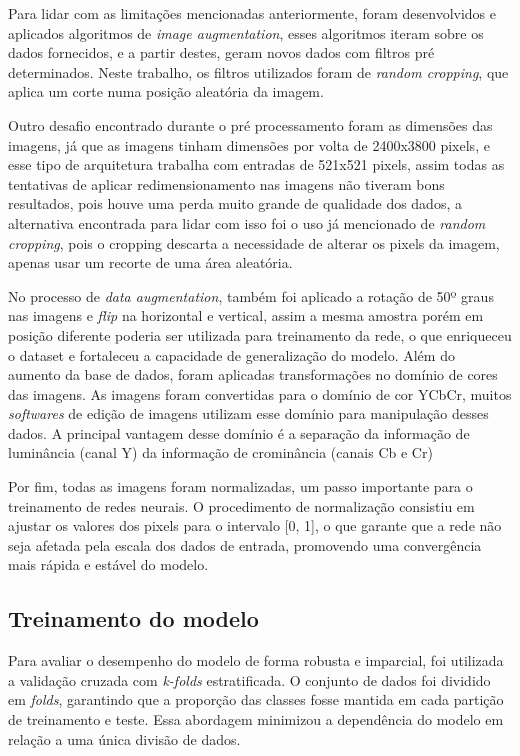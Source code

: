 Para lidar com as limitações mencionadas anteriormente, foram desenvolvidos e aplicados algoritmos de \textit{image augmentation}, esses algoritmos iteram sobre os dados fornecidos, e a partir destes, geram novos dados com filtros pré determinados. Neste trabalho, os filtros utilizados foram de \textit{random cropping}, que aplica um corte numa posição aleatória da imagem.

Outro desafio encontrado durante o pré processamento foram as dimensões das imagens, já que as imagens tinham dimensões por volta de 2400x3800 pixels, e esse tipo de arquitetura trabalha com entradas de 521x521 pixels, assim todas as tentativas de aplicar redimensionamento nas imagens não tiveram bons resultados, pois houve uma perda muito grande de qualidade dos dados, a alternativa encontrada para lidar com isso foi o uso já mencionado de \textit{random cropping}, pois o cropping descarta a necessidade de alterar os pixels da imagem, apenas usar um recorte de uma área aleatória.

No processo de \textit{data augmentation}, também foi aplicado a rotação de 50º graus nas imagens e \textit{flip} na horizontal e vertical, assim a mesma amostra porém em posição diferente poderia ser utilizada para treinamento da rede, o que enriqueceu o dataset e fortaleceu a capacidade de generalização do modelo. 
Além do aumento da base de dados, foram aplicadas transformações no domínio de cores das imagens. As imagens foram convertidas para o domínio de cor YCbCr, muitos \textit{softwares} de edição de imagens utilizam esse domínio para manipulação desses dados. A principal vantagem desse domínio é a separação da informação de luminância (canal Y) da informação de crominância (canais Cb e Cr)

Por fim, todas as imagens foram normalizadas, um passo importante para o treinamento de redes neurais. O procedimento de normalização consistiu em ajustar os valores dos pixels para o intervalo [0, 1], o que garante que a rede não seja afetada pela escala dos dados de entrada, promovendo uma convergência mais rápida e estável do modelo.

\subsection{Treinamento do modelo}

Para avaliar o desempenho do modelo de forma robusta e imparcial, foi utilizada a validação cruzada com \textit{k-folds} estratificada. O conjunto de dados foi dividido em \textit{folds}, garantindo que a proporção das classes fosse mantida em cada partição de treinamento e teste. Essa abordagem minimizou a dependência do modelo em relação a uma única divisão de dados.

